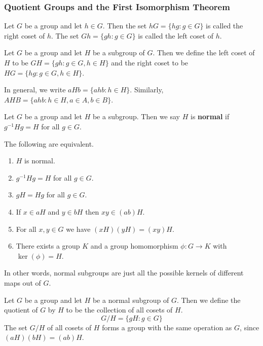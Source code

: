 \subsubsection{Quotient Groups and the First Isomorphism Theorem}
\begin{defn}[Coset of $h$]  Let $G$ be a group and let $h \in G$. Then the set $hG = \{hg : g \in G\}$ is called the right coset of $h$. The set $Gh = \{gh : g \in G\}$ is called the left coset of $h$.
\end{defn}
\begin{defn}[Coset of $H$] Let $G$ be a group and let $H$ be a subgroup of $G$. Then we define the left coset of $H$ to be $GH = \{gh : g\in G, h\in H\}$ and the right coset to be $HG = \{hg : g\in G, h \in H\}$.
\end{defn}
\begin{remark*}
    In general, we write $aHb = \{ahb : h \in H\}$. Similarly, $AHB=\{ahb : h \in H, a\in A, b\in B\}$.
\end{remark*}
\begin{defn}
    Let $G$ be a group and let $H$ be a subgroup. Then we say $H$ is \textbf{normal} if $g^{-1} H g = H$ for all $g\in G$.
\end{defn}
\begin{thm}
    The following are equivalent.
    \begin{enumerate}
    \item {
    $H$ is normal.
    }
    \item {
    $g^{-1} H g = H$ for all $g \in G$.
    }
    \item {
    $gH = Hg$ for all $g \in G$.
    }
    \item {
    If $x \in aH$ and $y \in bH$ then $xy \in (ab)H$.
    }
    \item {
    For all $x,y \in G$ we have $(xH)(yH) = (xy)H$.
    }
    \item {
    There exists a group $K$ and a group homomorphism $\phi : G \to K$ with $\ker(\phi) = H$.
    }
    \end{enumerate}
\end{thm}
\begin{remark*}
    In other words, normal subgroups are just all the possible kernels of different maps out of $G$.
\end{remark*}
\begin{defn}
Let $G$ be a group and let $H$ be a normal subgroup of $G$. Then we define the quotient of $G$ by $H$ to be the collection of all cosets of $H$.
\begin{equation}G/H = \{gH : g \in G\}
\end{equation}
The set $G/H$ of all cosets of $H$ forms a group with the same operation as $G$, since $(aH)(bH) = (ab)H$.
\end{defn}
